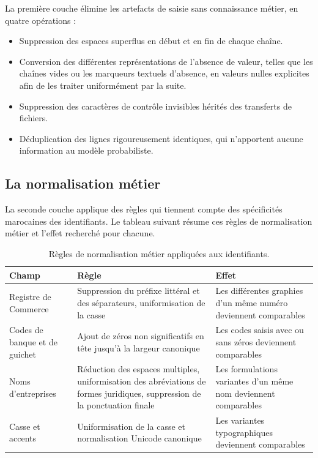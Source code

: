 La première couche élimine les artefacts de saisie sans connaissance métier, en quatre opérations :

\begin{itemize}
    \item Suppression des espaces superflus en début et en fin de chaque chaîne.
    \item Conversion des différentes représentations de l'absence de valeur, telles que les chaînes vides ou les marqueurs textuels d'absence, en valeurs nulles explicites afin de les traiter uniformément par la suite.
    \item Suppression des caractères de contrôle invisibles hérités des transferts de fichiers.
    \item Déduplication des lignes rigoureusement identiques, qui n'apportent aucune information au modèle probabiliste.
\end{itemize}

\subsection{La normalisation métier}

La seconde couche applique des règles qui tiennent compte des spécificités marocaines des identifiants. Le tableau suivant résume ces règles de normalisation métier et l'effet recherché pour chacune.

\begin{table}[H]
\centering
\caption{Règles de normalisation métier appliquées aux identifiants.}
\renewcommand{\arraystretch}{1.3}
\setlength{\tabcolsep}{3pt}
{\small
\begin{tabular}{|p{3.2cm}|p{5.2cm}|p{5.2cm}|}
\hline
\textbf{Champ} & \textbf{Règle} & \textbf{Effet} \\
\hline
Registre de Commerce & Suppression du préfixe littéral et des séparateurs, uniformisation de la casse & Les différentes graphies d'un même numéro deviennent comparables \\
\hline
Codes de banque et de guichet & Ajout de zéros non significatifs en tête jusqu'à la largeur canonique & Les codes saisis avec ou sans zéros deviennent comparables \\
\hline
Noms d'entreprises & Réduction des espaces multiples, uniformisation des abréviations de formes juridiques, suppression de la ponctuation finale & Les formulations variantes d'un même nom deviennent comparables \\
\hline
Casse et accents & Uniformisation de la casse et normalisation Unicode canonique & Les variantes typographiques deviennent comparables \\
\hline
\end{tabular}
}
\end{table}

